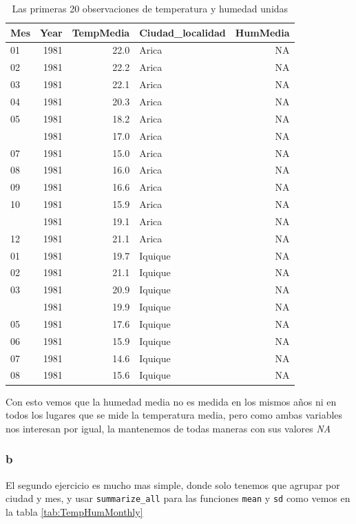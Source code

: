 \documentclass[]{book}
\begin{document}
\begin{table}

\caption{\label{tab:TempHum}Las primeras 20 observaciones de temperatura y humedad unidas}
\centering
\begin{tabular}[t]{lrrlr}
\toprule
Mes & Year & TempMedia & Ciudad\_localidad & HumMedia\\
\midrule
01 & 1981 & 22.0 & Arica & NA\\
02 & 1981 & 22.2 & Arica & NA\\
03 & 1981 & 22.1 & Arica & NA\\
04 & 1981 & 20.3 & Arica & NA\\
05 & 1981 & 18.2 & Arica & NA\\
\addlinespace
06 & 1981 & 17.0 & Arica & NA\\
07 & 1981 & 15.0 & Arica & NA\\
08 & 1981 & 16.0 & Arica & NA\\
09 & 1981 & 16.6 & Arica & NA\\
10 & 1981 & 15.9 & Arica & NA\\
\addlinespace
11 & 1981 & 19.1 & Arica & NA\\
12 & 1981 & 21.1 & Arica & NA\\
01 & 1981 & 19.7 & Iquique & NA\\
02 & 1981 & 21.1 & Iquique & NA\\
03 & 1981 & 20.9 & Iquique & NA\\
\addlinespace
04 & 1981 & 19.9 & Iquique & NA\\
05 & 1981 & 17.6 & Iquique & NA\\
06 & 1981 & 15.9 & Iquique & NA\\
07 & 1981 & 14.6 & Iquique & NA\\
08 & 1981 & 15.6 & Iquique & NA\\
\bottomrule
\end{tabular}
\end{table}

Con esto vemos que la humedad media no es medida en los mismos años ni
en todos los lugares que se mide la temperatura media, pero como ambas
variables nos interesan por igual, la mantenemos de todas maneras con
sus valores \emph{NA}

\hypertarget{b-1}{%
\subsubsection{b}\label{b-1}}

El segundo ejercicio es mucho mas simple, donde solo tenemos que agrupar
por ciudad y mes, y usar \texttt{summarize\_all} para las funciones
\texttt{mean} y \texttt{sd} como vemos en la tabla
\ref{tab:TempHumMonthly}
\end{document}
